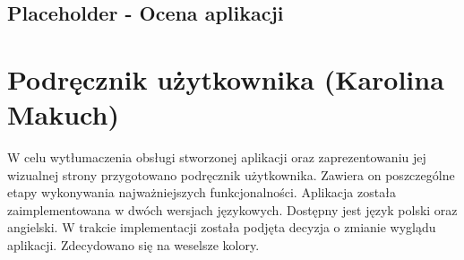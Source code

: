 \documentclass[10pt,twoside,a4paper]{report}
\begin{document}
\section{Placeholder - Ocena aplikacji}

\chapter{Podręcznik użytkownika (Karolina Makuch)}
\par W celu wytłumaczenia obsługi stworzonej aplikacji oraz zaprezentowaniu jej wizualnej strony przygotowano podręcznik użytkownika. Zawiera on poszczególne etapy wykonywania najważniejszych funkcjonalności.
Aplikacja została zaimplementowana w dwóch wersjach językowych. Dostępny jest język polski oraz angielski.
W trakcie implementacji została podjęta decyzja o zmianie wyglądu aplikacji. Zdecydowano się na weselsze kolory.
\end{document}
